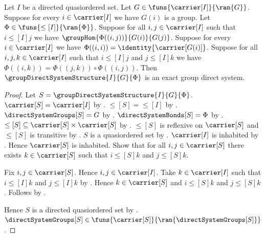 \begin{theorem}\label{group_direct_system_structure_is_system}
    Let $I$ be a directed quasiordered set.
    Let $G\in\funs{\carrier[I]}{\ran{G}}$.
    Suppose for every $i\in\carrier[I]$ we have $G(i)$ is a group.
    Let $\Phi\in\funs{\leq[I]}{\ran{\Phi}}$.
    Suppose for all $i,j\in\carrier[I]$ such that
        $i\mathrel{\leq[I]}j$ we have
        $\groupHom{\Phi((i,j))}{G(i)}{G(j)}$.
    Suppose for every $i\in\carrier[I]$ we have
        $\Phi((i,i))=\identity{\carrier[G(i)]}$.
    Suppose for all $i,j,k\in\carrier[I]$ such that
        $i\mathrel{\leq[I]}j$ and $j\mathrel{\leq[I]}k$ we have
        $\Phi((i,k))=\Phi((j,k))\circ\Phi((i,j))$.
    Then $\groupDirectSystemStructure{I}{G}{\Phi}$ is an exact
        group direct system.
\end{theorem}
\begin{proof}
    Let $S=\groupDirectSystemStructure{I}{G}{\Phi}$.
    $\carrier[S]=\carrier[I]$ by
        .
    $\leq[S]=\leq[I]$ by
        .
    $\directSystemGroups[S]=G$ by
        .
    $\directSystemBonds[S]=\Phi$ by
        .
    $\leq[S]\subseteq\carrier[S]\times\carrier[S]$ by
        .
    $\leq[S]$ is reflexive on $\carrier[S]$ and
        $\leq[S]$ is transitive by
        .
    $S$ is a quasiordered set by .
    $\carrier[I]$ is inhabited by
        .
    Hence $\carrier[S]$ is inhabited.
    Show that for all $i,j\in\carrier[S]$ there exists
        $k\in\carrier[S]$ such that
        $i\mathrel{\leq[S]}k$ and $j\mathrel{\leq[S]}k$.
    \begin{subproof}
        Fix $i,j\in\carrier[S]$.
        Hence $i,j\in\carrier[I]$.
        Take $k\in\carrier[I]$ such that
            $i\mathrel{\leq[I]}k$ and $j\mathrel{\leq[I]}k$ by
            .
        Hence $k\in\carrier[S]$ and
            $i\mathrel{\leq[S]}k$ and
            $j\mathrel{\leq[S]}k$.
        Follows by \auto.
    \end{subproof}
    Hence $S$ is a directed quasiordered set by .
    $\directSystemGroups[S]\in
        \funs{\carrier[S]}{\ran{\directSystemGroups[S]}}$.

\end{proof}
